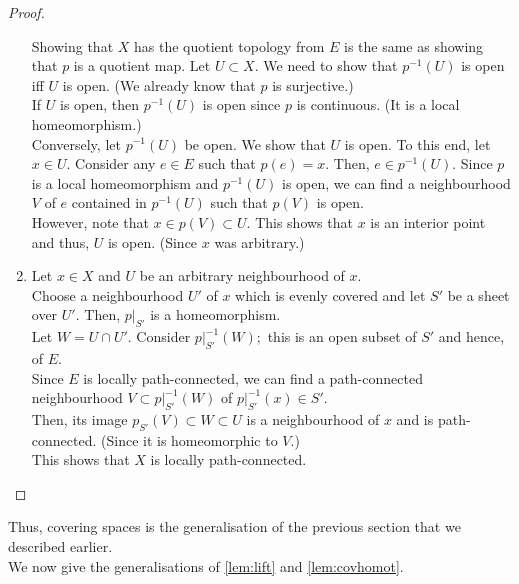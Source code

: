 \documentclass[12pt]{article}
\theoremstyle{definition}
\numberwithin{thm}{section}
\begin{document}
\begin{proof}
\begin{enumerate}
		Showing that $X$ has the quotient topology from $E$ is the same as showing that $p$ is a quotient map. Let $U \subset X.$ We need to show that $p^{-1}(U)$ is open iff $U$ is open. (We already know that $p$ is surjective.)\\
		If $U$ is open, then $p^{-1}(U)$ is open since $p$ is continuous. (It is a local homeomorphism.)\\
		Conversely, let $p^{-1}(U)$ be open. We show that $U$ is open. To this end, let $x \in U.$ Consider any $e \in E$ such that $p(e) = x.$ Then, $e \in p^{-1}(U).$ Since $p$ is a local homeomorphism and $p^{-1}(U)$ is open, we can find a neighbourhood $V$ of $e$ contained in $p^{-1}(U)$ such that $p(V)$ is open.\\
		However, note that $x \in p(V) \subset U.$ This shows that $x$ is an interior point and thus, $U$ is open. (Since $x$ was arbitrary.)
		\item Let $x \in X$ and $U$ be an arbitrary neighbourhood of $x.$\\
		Choose a neighbourhood $U'$ of $x$ which is evenly covered and let $S'$ be a sheet over $U'.$ Then, $p|_{S'}$ is a homeomorphism. \\
		Let $W = U \cap U'.$ Consider $p|_{S'}^{-1}(W);$ this is an open subset of $S'$ and hence, of $E.$\\
		Since $E$ is locally path-connected, we can find a path-connected neighbourhood $V \subset p|_{S'}^{-1}(W)$ of $p|_{S'}^{-1}(x) \in S'.$\\
		Then, its image $p_{S'}(V) \subset W \subset U$ is a neighbourhood of $x$ and is path-connected. (Since it is homeomorphic to $V.$)\\
		This shows that $X$ is locally path-connected. \qedhere
	\end{enumerate}
\end{proof}

Thus, covering spaces is the generalisation of the previous section that we described earlier.\\
We now give the generalisations of \cref{lem:lift} and \cref{lem:covhomot}.
\end{document}
